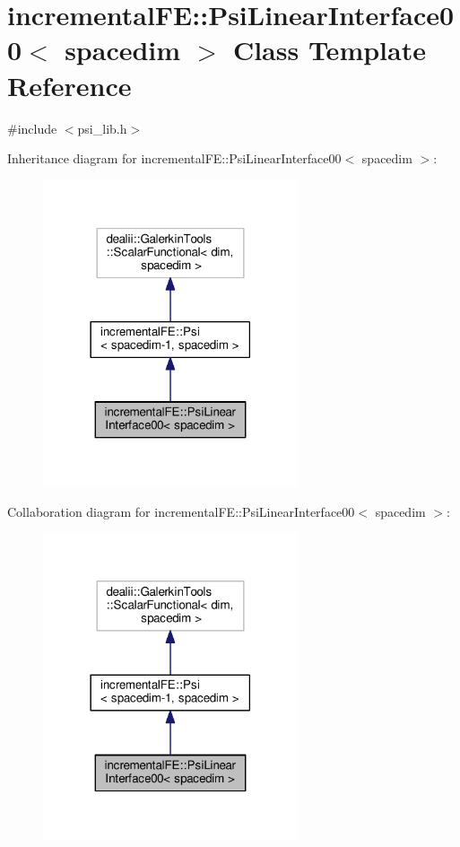 \hypertarget{classincremental_f_e_1_1_psi_linear_interface00}{}\section{incremental\+FE\+:\+:Psi\+Linear\+Interface00$<$ spacedim $>$ Class Template Reference}
\label{classincremental_f_e_1_1_psi_linear_interface00}


{\ttfamily \#include $<$psi\+\_\+lib.\+h$>$}



Inheritance diagram for incremental\+FE\+:\+:Psi\+Linear\+Interface00$<$ spacedim $>$\+:\nopagebreak
\begin{figure}[H]
\begin{center}
\leavevmode
\includegraphics[width=213pt]{classincremental_f_e_1_1_psi_linear_interface00__inherit__graph}
\end{center}
\end{figure}


Collaboration diagram for incremental\+FE\+:\+:Psi\+Linear\+Interface00$<$ spacedim $>$\+:\nopagebreak
\begin{figure}[H]
\begin{center}
\leavevmode
\includegraphics[width=213pt]{classincremental_f_e_1_1_psi_linear_interface00__coll__graph}
\end{center}
\end{figure}
